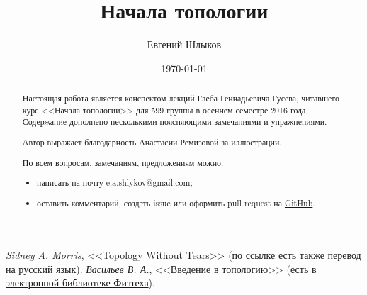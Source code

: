 \documentclass[12pt]{article}
\title{Начала топологии}
\author{Евгений Шлыков}
\affil{Московский физико-технический институт (государственный университет)}
\date{\today}
\theoremstyle{definition}
\theoremstyle{remark}
\theoremstyle{remark}
\theoremstyle{remark}
\theoremstyle{remark}
\begin{document}
\maketitle

\begin{abstract}
	Настоящая работа является конспектом лекций Глеба Геннадьевича Гусева, читавшего курс <<Начала топологии>>
	для 599 группы в осеннем семестре 2016 года. Содержание дополнено несколькими поясняющими замечаниями
	и упражнениями.

	Автор выражает благодарность Анастасии Ремизовой за иллюстрации.

	По всем вопросам, замечаниям, предложениям можно:
	\begin{itemize}
		\item написать на почту
			\href{mailto:e.a.shlykov@gmail.com?subject=[diht-topology-notes]}{e.a.shlykov@gmail.com};
		\item оставить комментарий, создать issue или оформить pull request на
			\href{https://github.com/eshlykov/diht-topology-notes}{GitHub}.
	\end{itemize}
\end{abstract}

\tableofcontents
\newpage

\begin{thebibliography}{9}
	 \textit{Sidney A. Morris}, <<\href{http://www.topologywithouttears.net}{Topology Without Tears}>>
		(по ссылке есть также перевод на русский язык).
	 \textit{Васильев В. А.}, <<Введение в топологию>>
		(есть в \href{http://lib.mipt.ru}{электронной библиотеке Физтеха}).
\end{thebibliography}









\end{document}
